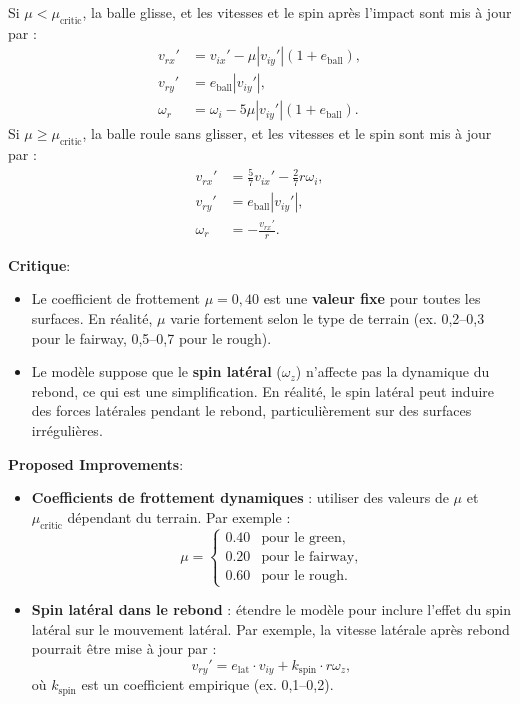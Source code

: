 \documentclass[10pt,a4paper]{report}
\begin{document}
Si $\mu < \mu_{\text{critic}}$, la balle glisse, et les vitesses et le spin après l'impact sont mis à jour par :
\[
\begin{aligned}
v_{rx}' &= v_{ix}' - \mu |v_{iy}'| (1 + e_{\text{ball}}), \\
v_{ry}' &= e_{\text{ball}} |v_{iy}'|, \\
\omega_r &= \omega_i - 5 \mu |v_{iy}'| (1 + e_{\text{ball}}).
\end{aligned}
\]
Si $\mu \geq \mu_{\text{critic}}$, la balle roule sans glisser, et les vitesses et le spin sont mis à jour par :
\[
\begin{aligned}
v_{rx}' &= \frac{5}{7} v_{ix}' - \frac{2}{7} r \omega_i, \\
v_{ry}' &= e_{\text{ball}} |v_{iy}'|, \\
\omega_r &= -\frac{v_{rx}'}{r}.
\end{aligned}
\]

\textbf{Critique}:
\begin{itemize}
    \item Le coefficient de frottement $\mu = 0{,}40$ est une \textbf{valeur fixe} pour toutes les surfaces. En réalité, $\mu$ varie fortement selon le type de terrain (ex. 0,2--0,3 pour le fairway, 0,5--0,7 pour le rough).
    \item Le modèle suppose que le \textbf{spin latéral} ($\omega_z$) n'affecte pas la dynamique du rebond, ce qui est une simplification. En réalité, le spin latéral peut induire des forces latérales pendant le rebond, particulièrement sur des surfaces irrégulières.
\end{itemize}

\textbf{Proposed Improvements}:
\begin{itemize}
    \item \textbf{Coefficients de frottement dynamiques} : utiliser des valeurs de $\mu$ et $\mu_{\text{critic}}$ dépendant du terrain. Par exemple :
    \[
    \mu =
    \begin{cases}
    0.40 & \text{pour le green}, \\
    0.20 & \text{pour le fairway}, \\
    0.60 & \text{pour le rough}.
    \end{cases}
    \]
    \item \textbf{Spin latéral dans le rebond} : étendre le modèle pour inclure l'effet du spin latéral sur le mouvement latéral. Par exemple, la vitesse latérale après rebond pourrait être mise à jour par :
    \[
    v_{ry}' = e_{\text{lat}} \cdot v_{iy} + k_{\text{spin}} \cdot r \omega_z,
    \]
    où $k_{\text{spin}}$ est un coefficient empirique (ex. 0,1--0,2).
\end{itemize}
\end{document}
